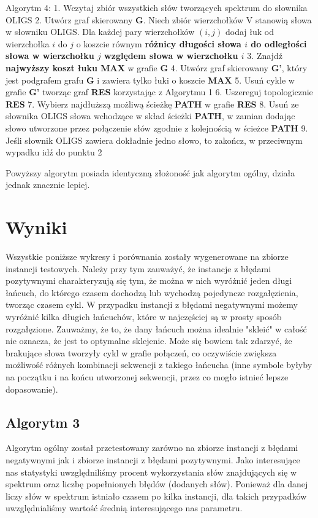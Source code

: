 \documentclass[a4paper]{article}
\begin{document}
Algorytm 4:
1. Wczytaj zbiór wszystkich słów tworzących spektrum do słownika OLIGS
2. Utwórz graf skierowany {\bf G}. Niech zbiór wierzchołków V stanowią słowa w słowniku OLIGS. Dla każdej pary wierzchołków $(i,j)$ dodaj łuk od wierzchołka $i$ do $j$ o koszcie równym {\bf różnicy długości słowa $i$ do odległości słowa w wierzchołku $j$ względem słowa w wierzchołku $i$}
3. Znajdź {\bf najwyższy koszt łuku MAX} w grafie {\bf G}
4. Utwórz graf skierowany {\bf G'}, który jest podgrafem grafu {\bf G} i zawiera tylko łuki o koszcie {\bf MAX}
5. Usuń cykle w grafie {\bf G'} tworząc graf {\bf RES} korzystając z Algorytmu 1
6. Uszereguj topologicznie {\bf RES}
7. Wybierz najdłuższą możliwą ścieżkę {\bf PATH} w grafie {\bf RES}
8. Usuń ze słownika OLIGS słowa wchodzące w skład ścieżki {\bf PATH}, w zamian dodając słowo utworzone przez połączenie słów zgodnie z kolejnością w ścieżce {\bf PATH}
9. Jeśli słownik OLIGS zawiera dokładnie jedno słowo, to zakończ, w przeciwnym wypadku idź do punktu 2

Powyższy algorytm posiada identyczną złożoność jak algorytm ogólny, działa jednak znacznie lepiej.

\section{Wyniki}

Wszystkie poniższe wykresy i porównania zostały wygenerowane na zbiorze instancji testowych. Należy przy tym zauważyć, że instancje z błędami pozytywnymi charakteryzują się tym, że można w nich wyróżnić jeden długi łańcuch, do którego czasem dochodzą lub wychodzą pojedyncze rozgałęzienia, tworząc czasem cykl. W przypadku instancji z błędami negatywnymi możemy wyróżnić kilka długich łańcuchów, które w najczęściej są w prosty sposób rozgałęzione. Zauważmy, że to, że dany łańcuch można idealnie "skleić" w całość nie oznacza, że jest to optymalne sklejenie. Może się bowiem tak zdarzyć, że brakujące słowa tworzyły cykl w grafie połączeń, co oczywiście zwiększa możliwość różnych kombinacji sekwencji z takiego łańcucha (inne symbole byłyby na początku i na końcu utworzonej sekwencji, przez co mogło istnieć lepsze dopasowanie).

\subsection{Algorytm 3}

Algorytm ogólny został przetestowany zarówno na zbiorze instancji z błędami negatywnymi jak i zbiorze instancji z błędami pozytywnymi. Jako interesujące nas statystyki uwzględniliśmy procent wykorzystania słów znajdujących się w spektrum oraz liczbę popełnionych błędów (dodanych słów). Ponieważ dla danej liczy słów w spektrum istniało czasem po kilka instancji, dla takich przypadków uwzględnialiśmy wartość średnią interesującego nas parametru.
\end{document}
